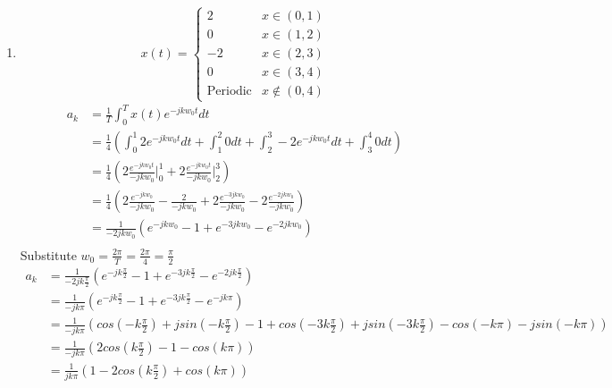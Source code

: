 \documentclass[10pt,a4paper, margin=1in]{article}
\begin{document}
\begin{enumerate}
\item
\[ x(t) = \begin{cases}
        2 & x \in (0, 1) \\
        0 & x \in (1, 2) \\
        -2 & x \in (2, 3) \\
        0 & x \in (3, 4) \\
        \text{Periodic} & x \notin (0, 4)
\end{cases}\]
\begin{align*}
    a_k &= \frac{1}{T} \int_{0}^{T} x(t) e^{-jkw_0t} dt \\
    &= \frac{1}{4} (\int_{0}^{1} 2e^{-jkw_0t} dt + \int_{1}^{2} 0 dt + \int_{2}^{3} -2 e^{-jkw_0t} dt + \int_{3}^{4} 0 dt) \\
    &= \frac{1}{4} (2\frac{e^{-jkw_0t}}{-jkw_0} \Big|_{0}^{1} + 2\frac{e^{-jkw_0t}}{-jkw_0} \Big|_{2}^{3}) \\
    &= \frac{1}{4} (2\frac{e^{-jkw_0}}{-jkw_0} - \frac{2}{-jkw_0} + 2\frac{e^{-3jkw_0}}{-jkw_0} - 2\frac{e^{-2jkw_0}}{-jkw_0}) \\
    &= \frac{1}{-2jkw_0} (e^{-jkw_0} - 1 + e^{-3jkw_0} - e^{-2jkw_0}) \\
\end{align*}
Substitute $w_0 = \frac{2\pi}{T} = \frac{2\pi}{4} = \frac{\pi}{2}$\\

\begin{align*}
    a_k &= \frac{1}{-2jk\frac{\pi}{2}} (e^{-jk\frac{\pi}{2}} - 1 + e^{-3jk\frac{\pi}{2}} - e^{-2jk\frac{\pi}{2}}) \\
    &= \frac{1}{-jk\pi} (e^{-jk\frac{\pi}{2}} - 1 + e^{-3jk\frac{\pi}{2}} - e^{-jk\pi}) \\
    &= \frac{1}{-jk\pi} (cos(-k\frac{\pi}{2}) + jsin(-k\frac{\pi}{2}) - 1 + cos(-3k\frac{\pi}{2}) + jsin(-3k\frac{\pi}{2}) - cos(-k\pi) - jsin(-k\pi)) \\
    &= \frac{1}{-jk\pi} (2cos(k\frac{\pi}{2}) - 1 - cos(k\pi)) \\
    &= \frac{1}{jk\pi} (1 - 2cos(k\frac{\pi}{2}) + cos(k\pi)) \\
\end{align*}



\end{enumerate}
\end{document}
